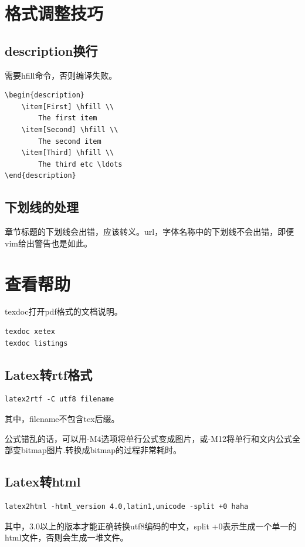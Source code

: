 \section{格式调整技巧}
\subsection{description换行}
需要hfill命令，否则编译失败。
\begin{verbatim}
\begin{description}
    \item[First] \hfill \\
        The first item
    \item[Second] \hfill \\
        The second item
    \item[Third] \hfill \\
        The third etc \ldots
\end{description}
\end{verbatim}

\subsection{下划线的处理}
章节标题的下划线会出错，应该转义。url，字体名称中的下划线不会出错，即便vim给出警告也是如此。
\section{查看帮助}
texdoc打开pdf格式的文档说明。
\begin{verbatim}
texdoc xetex
texdoc listings
\end{verbatim}





\subsection{Latex转rtf格式}
\begin{verbatim}
latex2rtf -C utf8 filename
\end{verbatim}
其中，filename不包含tex后缀。

公式错乱的话，可以用-M4选项将单行公式变成图片，或-M12将单行和文内公式全部变bitmap图片.转换成bitmap的过程非常耗时。

\subsection{Latex转html}
\begin{verbatim}
latex2html -html_version 4.0,latin1,unicode -split +0 haha
\end{verbatim}
其中，3.0以上的版本才能正确转换utf8编码的中文，split +0表示生成一个单一的html文件，否则会生成一堆文件。

